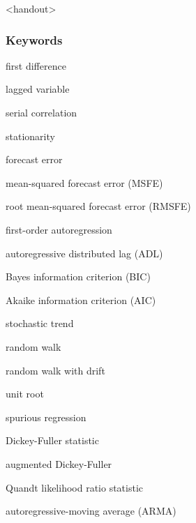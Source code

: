 

\begin{frame}<handout>
\frametitle{Keywords}
\begin{iteminline}
\item first difference
\item lagged variable
\item serial correlation
\item stationarity
\item forecast error
\item mean-squared forecast error (MSFE)
\item root mean-squared forecast error (RMSFE)
\item first-order autoregression
\item autoregressive distributed lag (ADL)
\item Bayes information criterion (BIC)
\item Akaike information criterion (AIC)
\item stochastic trend
\item random walk
\item random walk with drift
\item unit root
\item spurious regression
\item Dickey-Fuller statistic
\item augmented Dickey-Fuller
\item Quandt likelihood ratio statistic
\item autoregressive-moving average (ARMA)
\end{iteminline}
\end{frame}


